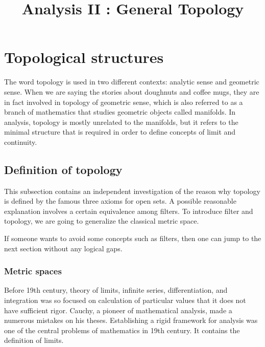 \documentclass{../crs}
\title{Analysis II : General Topology}
\begin{document}
\maketitle
\tableofcontents


\chapter{Topological structures}

The word topology is used in two different contexts: analytic sense and geometric sense.
When we are saying the stories about doughnuts and coffee mugs, they are in fact involved in topology of geometric sense, which is also referred to as a branch of mathematics that studies geometric objects called manifolds.
In analysis, topology is mostly unrelated to the manifolds, but it refers to the minimal structure that is required in order to define concepts of limit and continuity.











\section{Definition of topology}
This subsection contains an independent investigation of the reason why topology is defined by the famous three axioms for open sets.
A possible reasonable explanation involves a certain equivalence among filters.
To introduce filter and topology, we are going to generalize the classical metric space.

If someone wants to avoid some concepts such as filters, then one can jump to the next section without any logical gaps.


\subsection{Metric spaces}

Before 19th century, theory of limits, infinite series, differentiation, and integration was so focused on calculation of particular values that it does not have sufficient rigor.
Cauchy, a pioneer of mathematical analysis, made a numerous mistakes on his theses.
Establishing a rigid framework for analysis was one of the central problems of mathematics in 19th century.
It contains the definition of limits.
\end{document}
